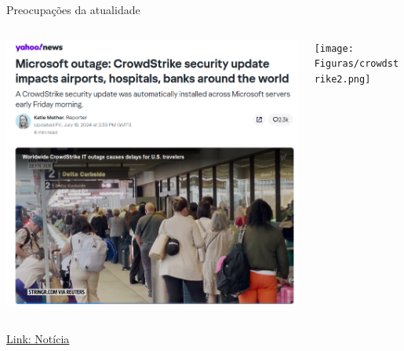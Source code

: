 \begin{frame}{Preocupações da atualidade}
    \centering
    \begin{columns}
        \begin{column}{0.48\linewidth}
            \includegraphics[width=\linewidth]{Figuras/crowdstrike1.png}
        \end{column}
        \begin{column}{0.48\linewidth}
            \texttt{[image: Figuras/crowdstrike2.png]}
        \end{column}
    \end{columns}
    \href{https://www.yahoo.com/news/microsoft-outage-crowdstrike-security-update-impacts-airports-hospitals-banks-around-the-world-151137547.html}{Link: Notícia}
\end{frame}

